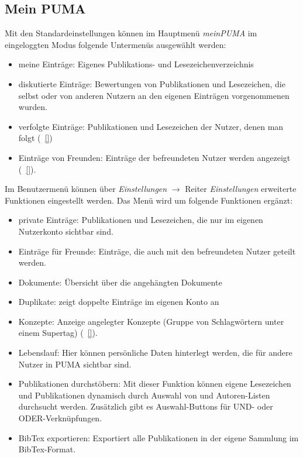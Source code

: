\subsection*{Mein PUMA}
\label{subsec:meinPuma}
Mit den Standardeinstellungen  können im Hauptmenü \textit{meinPUMA} im eingeloggten Modus folgende Untermenüs ausgewählt werden:
\begin{itemize}
\item meine Einträge: Eigenes Publikations- und Lesezeichenverzeichnis
\item diskutierte Einträge: Bewertungen von Publikationen und Lesezeichen, die selbst oder von anderen Nutzern an den eigenen Einträgen vorgenommenen wurden. 
\item verfolgte Einträge: Publikationen und Lesezeichen der Nutzer, denen man folgt (~\autoref{}) 
\item Einträge von Freunden: Einträge der befreundeten Nutzer werden angezeigt (~\autoref{}).
\end{itemize}
Im Benutzermenü können über \textit{Einstellungen} $\to$ Reiter \textit{Einstellungen} erweiterte Funktionen eingestellt werden. Das Menü wird um folgende Funktionen ergänzt:
\begin{itemize}
\item private Einträge: Publikationen und Lesezeichen, die nur im eigenen Nutzerkonto sichtbar sind. 
\item Einträge für Freunde: Einträge, die auch mit den befreundeten Nutzer geteilt werden.
\item Dokumente: Übersicht über die angehängten Dokumente
\item Duplikate: zeigt doppelte Einträge im eigenen Konto an
\item Konzepte: Anzeige angelegter Konzepte (Gruppe von Schlagwörtern unter einem Supertag) (~\autoref{}). 
\item Lebenslauf: Hier können persönliche Daten hinterlegt werden, die für andere Nutzer in PUMA sichtbar sind.
\item Publikationen durchstöbern: Mit dieser Funktion können eigene Lesezeichen und Publikationen dynamisch durch Auswahl von \tags und Autoren-Listen durchsucht werden. Zusätzlich gibt es Auswahl-Buttons für UND- oder ODER-Verknüpfungen.
\item BibTex exportieren: Exportiert alle Publikationen in der eigene Sammlung im BibTex-Format.
\end{itemize}

